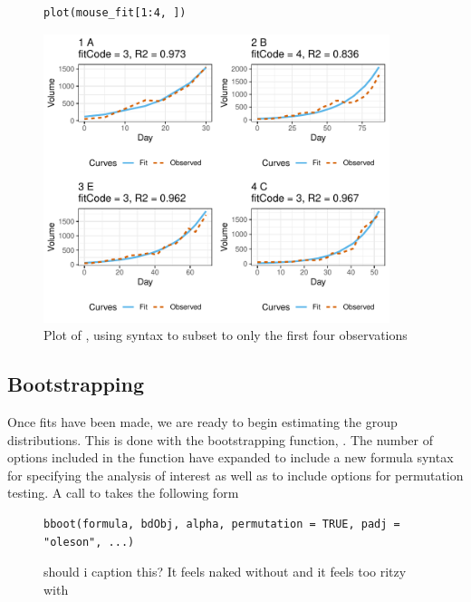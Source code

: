 \begin{singlespace}
\begin{figure}[H]
\centering
\begin{BVerbatim}
plot(mouse_fit[1:4, ])
\end{BVerbatim}
\end{figure}
\end{singlespace}

\begin{figure}[H]
\centering
\includegraphics[width=0.9\textwidth]{img/mouse_fit.pdf}
\caption{Plot of , using  syntax to subset to only the first four observations}
\label{fig:plot_fits}
\end{figure}

\subsection{Bootstrapping}

Once fits have been made, we are ready to begin estimating the group distributions. This is done with the bootstrapping function, . The number of options included in the  function have expanded to include a new formula syntax for specifying the analysis of interest as well as to include options for permutation testing. A call to  takes the following form

\begin{singlespace}
\begin{figure}[H]
\centering
\begin{BVerbatim}
bboot(formula, bdObj, alpha, permutation = TRUE, padj = "oleson", ...)
\end{BVerbatim}
\caption{should i caption this? It feels naked without and it feels too ritzy with}
\end{figure}
\end{singlespace}


